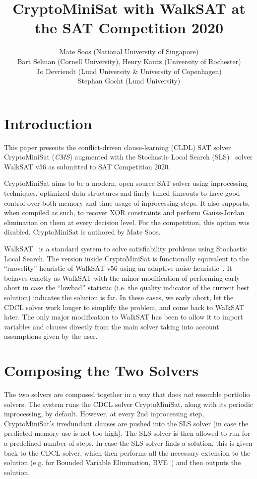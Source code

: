 \documentclass[final]{ieee}
\begin{document}
\title{CryptoMiniSat with WalkSAT at the SAT Competition 2020}
\author{Mate Soos (National University of Singapore)\\
Bart Selman (Cornell University), Henry Kautz (University of Rochester)\\
Jo Devriendt (Lund University \& University of Copenhagen)\\
Stephan Gocht (Lund University)}

\maketitle
\thispagestyle{empty}
\pagestyle{empty}

\section{Introduction}
This paper presents the conflict-driven clause-learning (CLDL) SAT solver CryptoMiniSat (\emph{CMS}) augmented with the Stochastic Local Search (SLS)~\cite{Selman95localsearch} solver WalkSAT v56 as submitted to SAT Competition 2020.

CryptoMiniSat aims to be a modern, open source SAT solver using inprocessing techniques, optimized data structures and finely-tuned timeouts to have good control over both memory and time usage of inprocessing steps. It also supports, when compiled as such, to recover XOR constraints and perform Gauss-Jordan elimination on them at every decision level. For the competition, this option was disabled. CryptoMiniSat is authored by Mate Soos.

WalkSAT~\cite{DBLP:conf/aaai/KautzS96} is a standard system to solve satisfiability problems using Stochastic Local Search. The version inside CryptoMiniSat is functionally equivalent to the ``rnovelity'' heuristic of WalkSAT v56 using an adaptive noise heuristic~\cite{DBLP:conf/aaai/Hoos02}. It behaves exactly as WalkSAT with the minor modification of performing early-abort in case the ``lowbad'' statistic (i.e. the quality indicator of the current best solution) indicates the solution is far. In these cases, we early abort, let the CDCL solver work longer to simplify the problem, and come back to WalkSAT later. The only major modification to WalkSAT has been to allow it to import variables and clauses directly from the main solver taking into account assumptions given by the user.

\section{Composing the Two Solvers}
The two solvers are composed together in a way that does \emph{not} resemble portfolio solvers. The system runs the CDCL solver CryptoMiniSat, along with its periodic inprocessing, by default. However, at every 2nd inprocessing step, CryptoMiniSat's irredundant clauses are pushed into the SLS solver (in case the predicted memory use is not too high). The SLS solver is then allowed to run for a predefined number of steps. In case the SLS solver finds a solution, this is given back to the CDCL solver, which then performs all the necessary extension to the solution (e.g. for Bounded Variable Elimination, BVE~\cite{BVE}) and then outputs the solution.
\end{document}
